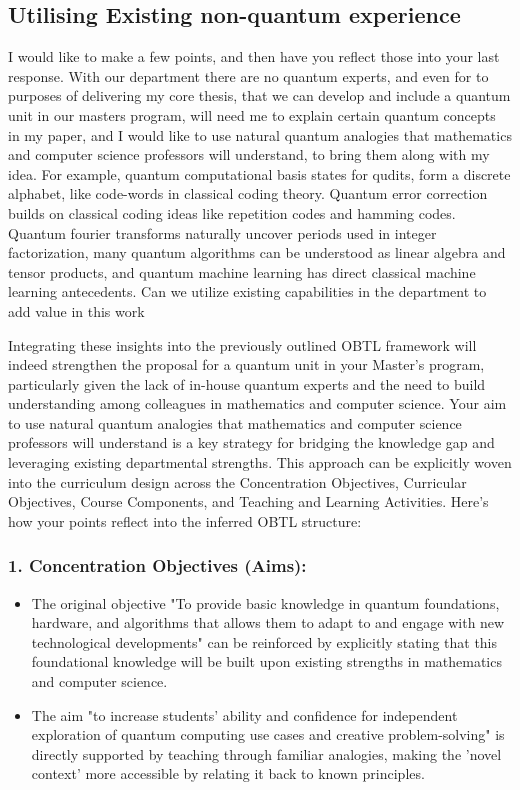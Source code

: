 \documentclass[11pt,a4paper]{article}
\begin{document}
\subsection{Utilising Existing non-quantum experience}

I would like to make a few points, and then have you reflect those into your last response.  With our department there are no quantum experts, and even for to purposes of delivering my core thesis, that we can develop and include a quantum unit in our masters program, will need me to explain certain quantum concepts in my paper, and I would like to use natural quantum analogies that mathematics and computer science professors will understand, to bring them along with my idea. For example, quantum computational basis states for qudits, form a discrete alphabet, like code-words in classical coding theory. Quantum error correction builds on classical coding ideas like repetition codes and hamming codes.  Quantum fourier transforms naturally uncover periods used in integer factorization, many quantum algorithms can be understood as linear algebra and tensor products, and quantum machine learning has direct classical machine learning antecedents.  Can we utilize existing capabilities in the department to add value in this work

Integrating these insights into the previously outlined OBTL framework will indeed strengthen the proposal for a quantum unit in your Master's program, particularly given the lack of in-house quantum experts and the need to build understanding among colleagues in mathematics and computer science.
Your aim to use natural quantum analogies that mathematics and computer science professors will understand is a key strategy for bridging the knowledge gap and leveraging existing departmental strengths. This approach can be explicitly woven into the curriculum design across the Concentration Objectives, Curricular Objectives, Course Components, and Teaching and Learning Activities.
Here’s how your points reflect into the inferred OBTL structure:

\subsubsection{1. Concentration Objectives (Aims):}

\begin{itemize}	
	
\item The original objective "To provide basic knowledge in quantum foundations, hardware, and algorithms that allows them to adapt to and engage with new technological developments"
can be reinforced by explicitly stating that this foundational knowledge will be built upon existing strengths in mathematics and computer science.

\item The aim "to increase students' ability and confidence for independent exploration of quantum computing use cases and creative problem-solving"
is directly supported by teaching through familiar analogies, making the 'novel context' more accessible by relating it back to known principles.

\end{itemize}	
\end{document}
